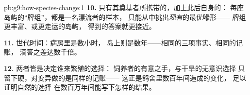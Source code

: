 \begin{solution}{pb:g9:how-species-change:1}
\textbf{10.} 只有其奠基者所携带的，加上此后自身的：
每座岛屿的“牌组”，都是一名漂流者的样本，
只能从中挑出\emph{现有}的最优喙形——
牌组更丰富、或更走运的岛屿，
得到的答案就更接近。

\textbf{11.} 世代时间：病房里是数小时，
岛上则是数年——相同的三项事实、相同的记账，
滴答之差达数千倍。

\textbf{12.} 两者皆是决定谁来繁殖的选择：
饲养者的有意之手，与干旱的无意识选择
只留下硬，对变异做的是同样的记账——
这正是鸽舍里数百年间造成的变化，
足以证明自然的选择
在数百万年间能写下怎样的结果。
\end{solution}
